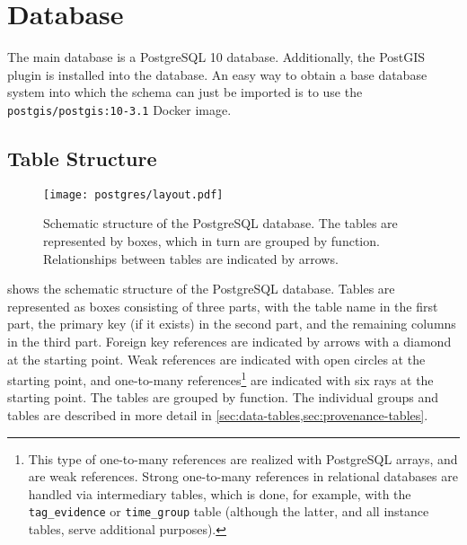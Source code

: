 \chapter{Database}

The main database is a PostgreSQL 10 database.
Additionally, the PostGIS plugin is installed into the database.
An easy way to obtain a base database system into which the schema can just be imported is to use the \verb!postgis/postgis:10-3.1! Docker image.


\section{Table Structure}

\begin{figure}[tb]
  \centering
  \texttt{[image: postgres/layout.pdf]}
  \caption{%
    Schematic structure of the PostgreSQL database.
    The tables are represented by boxes, which in turn are grouped by function.
    Relationships between tables are indicated by arrows.
    }
  \label{fig:db-structure}
\end{figure}

 shows the schematic structure of the PostgreSQL database.
Tables are represented as boxes consisting of three parts, with the table name in the first part, the primary key (if it exists) in the second part, and the remaining columns in the third part.
Foreign key references are indicated by
arrows with a diamond at the starting point.
Weak references are indicated with
open circles at the starting point, and one-to-many references\footnote{
  This type of one-to-many references are realized with PostgreSQL arrays, and are weak references.
  Strong one-to-many references in relational databases are handled via intermediary tables, which is done, for example, with the \texttt{tag\_evidence} or \texttt{time\_group} table (although the latter, and all instance tables, serve additional purposes).
}
are indicated with six rays at the starting point.
The tables are grouped by function.
The individual groups and tables are described in more detail in \cref{sec:data-tables,sec:provenance-tables}.


